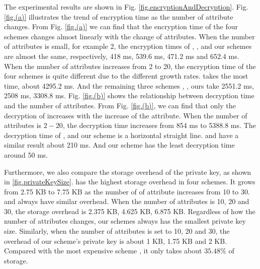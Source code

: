 \documentclass[smallextended]{svjour3}       %
\begin{document}
The experimental results are shown in Fig. \ref{fig.encryptionAndDecryption}.
Fig. \ref{fig.(a)} illustrates the trend of encryption time as the number of attribute changes.
From Fig. \ref{fig.(a)} we can find that the encryption time of the four schemes changes almost linearly with the change of attributes.
When the number of attributes is small, for example 2, the encryption times of \cite{hur2013attribute}, \cite{helil2017cp}, \cite{muller2011hiding} and our schemes are almost the same, respectively, 418 ms, 539.6 ms, 471.2 ms and 652.4 ms.
When the number of attributes increases from 2 to 20, the encryption time of the four schemes is quite different due to the different growth rates. 
\cite{muller2011hiding} takes the most time, about 4295.2 ms.
And the remaining three schemes \cite{hur2013attribute}, \cite{helil2017cp}, ours take 2551.2 ms, 2508 ms, 3308.8 ms.
Fig. \ref{fig.(b)} shows the relationship between decryption time and the number of attributes.
From Fig. \ref{fig.(b)}, we can find that only the decryption of \cite{muller2011hiding} increases with the increase of the attribute.
When the number of attributes is $2-20$, the decryption time increases from 854 ms to 5388.8 ms.
The decryption time of \cite{hur2013attribute}, \cite{helil2017cp} and our scheme is a horizontal straight line.
\cite{hur2013attribute} and \cite{helil2017cp} have a similar result about 210 ms.
And our scheme has the least decryption time around 50 ms.

Furthermore, we also compare the storage overhead of the private key, as shown in \ref{fig.privateKeySize}.
\cite{muller2011hiding} has the highest storage overhead in four schemes.
It grows from 2.75 KB to 7.75 KB as the number of of attribute increases from 10 to 30.
\cite{hur2013attribute} and \cite{helil2017cp} always have similar overhead.
When the number of attributes is 10, 20 and 30, the storage overhead is 2.375 KB, 4.625 KB, 6.875 KB.
Regardless of how the number of attributes changes, our schemes always has the smallest private key size.
Similarly, when the number of attributes is set to 10, 20 and 30, the overhead of our scheme's private key is about 1 KB, 1.75 KB and 2 KB.
Compared with the most expensive scheme \cite{muller2011hiding}, it only takes about $35.48\%$ of storage.
\end{document}
